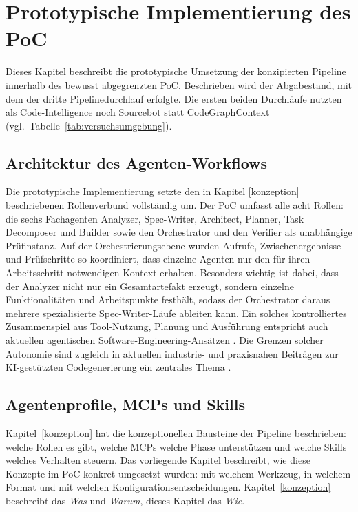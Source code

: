 \section{Prototypische Implementierung des PoC} \label{implementierung}

Dieses Kapitel beschreibt die prototypische Umsetzung der konzipierten Pipeline innerhalb des bewusst abgegrenzten PoC. Beschrieben wird der Abgabestand, mit dem der dritte Pipelinedurchlauf erfolgte. Die ersten beiden Durchläufe nutzten als Code-Intelligence noch Sourcebot statt CodeGraphContext (vgl.\ Tabelle~\ref{tab:versuchsumgebung}).

\subsection{Architektur des Agenten-Workflows}

Die prototypische Implementierung setzte den in Kapitel \ref{konzeption} beschriebenen Rollenverbund vollständig um. Der PoC umfasst alle acht Rollen: die sechs Fachagenten Analyzer, Spec-Writer, Architect, Planner, Task Decomposer und Builder sowie den Orchestrator und den Verifier als unabhängige Prüfinstanz. Auf der Orchestrierungsebene wurden Aufrufe, Zwischenergebnisse und Prüfschritte so koordiniert, dass einzelne Agenten nur den für ihren Arbeitsschritt notwendigen Kontext erhalten. Besonders wichtig ist dabei, dass der Analyzer nicht nur ein Gesamtartefakt erzeugt, sondern einzelne Funktionalitäten und Arbeitspunkte festhält, sodass der Orchestrator daraus mehrere spezialisierte Spec-Writer-Läufe ableiten kann. Ein solches kontrolliertes Zusammenspiel aus Tool-Nutzung, Planung und Ausführung entspricht auch aktuellen agentischen Software-Engineering-Ansätzen \parencite{yang2024sweagent,huang2024planningagents}. Die Grenzen solcher Autonomie sind zugleich in aktuellen industrie- und praxisnahen Beiträgen zur KI-gestützten Codegenerierung ein zentrales Thema \parencite{boeckeler2025autonomy}.

\subsection{Agentenprofile, MCPs und Skills}

Kapitel~\ref{konzeption} hat die konzeptionellen Bausteine der Pipeline beschrieben: welche Rollen es gibt, welche MCPs welche Phase unterstützen und welche Skills welches Verhalten steuern. Das vorliegende Kapitel beschreibt, wie diese Konzepte im PoC konkret umgesetzt wurden: mit welchem Werkzeug, in welchem Format und mit welchen Konfigurationsentscheidungen. Kapitel~\ref{konzeption} beschreibt das \emph{Was} und \emph{Warum}, dieses Kapitel das \emph{Wie}.

